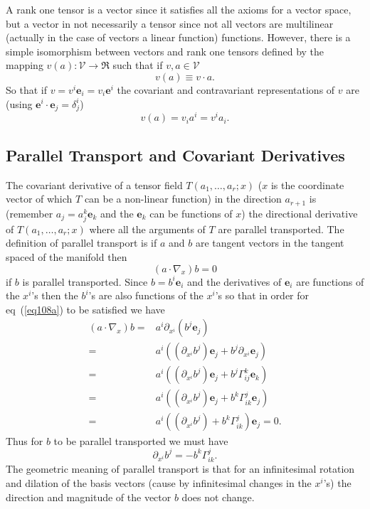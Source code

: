 \documentclass[12pt]{report}
\newcommand{\bm}[1]{\boldsymbol{#1}}
\newcommand{\lp}{\left (}
\newcommand{\rp}{\right )}
\newcommand{\f}[2]{{#1}\lp {#2} \rp}
\newcommand{\paren}[1]{\lp {#1} \rp}
\newcommand{\be}{\begin{equation}}
\newcommand{\ee}{\end{equation}}
\newcommand{\eb}{\bm{e}}
\begin{document}
A rank one tensor is a vector since it satisfies all the axioms for a vector space, but a vector in not necessarily a tensor since not all vectors
are multilinear (actually in the case of vectors a linear function) functions.  However, there is a simple isomorphism between vectors and
rank one tensors defined by the mapping $\f{v}{a}:\mathcal{V}\rightarrow\Re$ such that if $v,a \in\mathcal{V}$
\be
    \f{v}{a} \equiv v\cdot a.
\ee
So that if $v = v^{i}\eb_{i} = v_{i}\eb^{i}$ the covariant and contravariant representations of $v$ are
(using $\eb^{i}\cdot\eb_{j} = \delta^{i}_{j}$)
\be
    \f{v}{a} = v_{i}a^{i} = v^{i}a_{i}.
\ee


\subsection{Parallel Transport and Covariant Derivatives}
The covariant derivative of a tensor field $\f{T}{a_{1},\dots,a_{r};x}$ ($x$ is the coordinate vector of which $T$ can be a non-linear function) in
the direction $a_{r+1}$ is (remember $a_{j} = a_{j}^{k}\eb_{k}$ and the $\eb_{k}$ can be functions of $x$) the directional derivative of
$\f{T}{a_{1},\dots,a_{r};x}$ where all the arguments of $T$ are parallel transported. The definition of parallel transport is if $a$ and $b$ are
tangent vectors in the tangent spaced of the manifold then
\be
    \paren{a\cdot\nabla_{x}}b = 0 \label{eq108a}
\ee
if $b$ is parallel transported.  Since $b = b^{i}\eb_{i}$ and the derivatives of $\eb_{i}$ are functions of the $x^{i}$'s then the $b^{i}$'s are
also functions of the $x^{i}$'s so that in order for eq~(\ref{eq108a}) to be satisfied we have
\begin{align}
    \paren{a\cdot\nabla_{x}}b =& a^{i}\partial_{x^{i}}\paren{b^{j}\eb_{j}} \nonumber \\
                              =& a^{i}\paren{\paren{\partial_{x^{i}}b^{j}}\eb_{j} + b^{j}\partial_{x^{i}}\eb_{j}} \nonumber \\
                              =& a^{i}\paren{\paren{\partial_{x^{i}}b^{j}}\eb_{j} + b^{j}\Gamma_{ij}^{k}\eb_{k}} \nonumber \\
                              =& a^{i}\paren{\paren{\partial_{x^{i}}b^{j}}\eb_{j} + b^{k}\Gamma_{ik}^{j}\eb_{j}}\nonumber \\
                              =& a^{i}\paren{\paren{\partial_{x^{i}}b^{j}} + b^{k}\Gamma_{ik}^{j}}\eb_{j} = 0.
\end{align}
Thus for $b$ to be parallel transported we must have
\be
    \partial_{x^{i}}b^{j} = -b^{k}\Gamma_{ik}^{j}. \label{eq121a}
\ee
The geometric meaning of parallel transport is that for an infinitesimal rotation and dilation of the basis vectors (cause by infinitesimal changes in the $x^{i}$'s) the direction and magnitude of the vector $b$ does not change.
\end{document}
